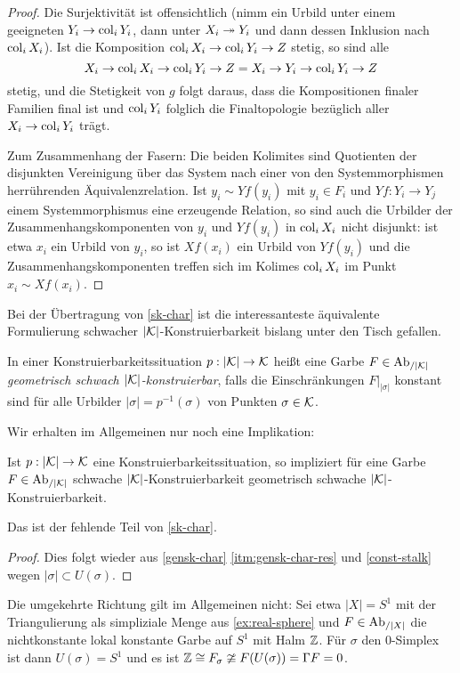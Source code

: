 \begin{proof}
  Die Surjektivität ist offensichtlich (nimm ein Urbild unter einem
  geeigneten $Y_i \to \operatorname{col}_i Y_i$, dann unter $X_i \twoheadrightarrow Y_i$ und dann
  dessen Inklusion nach $\operatorname{col}_i X_i$). Ist die Komposition $\operatorname{col}_i X_i
  \to \operatorname{col}_i Y_i \to Z$ stetig, so sind alle
  \[X_i \to \operatorname{col}_i X_i \to \operatorname{col}_i Y_i \to Z
  = X_i \to Y_i \to \operatorname{col}_i Y_i \to Z \] stetig, und die Stetigkeit von
  $g$ folgt daraus, dass die Kompositionen finaler Familien final ist
  und $\operatorname{col}_i Y_i$ folglich die Finaltopologie bezüglich aller $X_i
  \to \operatorname{col}_i Y_i$ trägt.

  Zum Zusammenhang der Fasern: Die beiden Kolimites sind Quotienten
  der disjunkten Vereinigung über das System nach einer von den
  Systemmorphismen herrührenden Äquivalenzrelation. Ist $y_i \sim
  Yf(y_i)$ mit $y_i \in F_i$ und $Yf: Y_i \to Y_j$ einem
  Systemmorphismus eine erzeugende Relation, so sind auch die Urbilder
  der Zusammenhangskomponenten von $y_i$ und $Yf(y_i)$ in $\operatorname{col}_i X_i$
  nicht disjunkt: ist etwa $x_i$ ein Urbild von $y_i$, so ist
  $Xf(x_i)$ ein Urbild von $Yf(y_i)$ und die Zusammenhangskomponenten
  treffen sich im Kolimes $\operatorname{col}_i X_i$ im Punkt $x_i \sim Xf(x_i)$.
\end{proof}
Bei der Übertragung von \ref{sk-char} ist die interessanteste
äquivalente Formulierung schwacher $|\mathcal{K}|$-Konstruierbarkeit bislang
unter den Tisch gefallen.
\begin{defn}
  In einer Konstruierbarkeitssituation $p: |\mathcal{K}| \to \mathcal{K}$ heißt eine
  Garbe $F \in \operatorname{Ab}_{/|\mathcal{K}|}$ \emph{geometrisch schwach $|\mathcal{K}|$-konstruierbar},
  falls die Einschränkungen $F|_{|\sigma|}$ konstant sind für alle
  Urbilder $|\sigma| = p^{-1}(\sigma)$ von Punkten $\sigma \in \mathcal{K}$.
\end{defn}
Wir erhalten im Allgemeinen nur noch eine Implikation:
\begin{prop} \label{gensk-char-geom}
  Ist $p: |\mathcal{K}| \to \mathcal{K}$ eine Konstruierbarkeitssituation, so impliziert
  für eine Garbe $F \in \operatorname{Ab}_{/|\mathcal{K}|}$ schwache $|\mathcal{K}|$-Konstruierbarkeit
  geometrisch schwache $|\mathcal{K}|$-Konstruierbarkeit.
\end{prop}
Das ist der fehlende Teil von \ref{sk-char}.
\begin{proof}
  Dies folgt wieder aus \ref{gensk-char} \ref{itm:gensk-char-res} und
  \ref{const-stalk} wegen $|\sigma| \subset U(\sigma)$.
\end{proof}
\begin{bsp}
  Die umgekehrte Richtung gilt im Allgemeinen nicht: Sei etwa $|X| =
  S^1$ mit der Triangulierung als simpliziale Menge aus
  \ref{ex:real-sphere} und $F \in \operatorname{Ab}_{/|X|}$ die nichtkonstante lokal
  konstante Garbe auf $S^1$ mit Halm $\mathbb{Z}$. Für $\sigma$ den
  $0$-Simplex ist dann $U(\sigma) = S^1$ und es ist $\mathbb{Z} \cong F_\sigma
  \ncong F(U(\sigma)) = \Gamma F = 0$.
\end{bsp}
